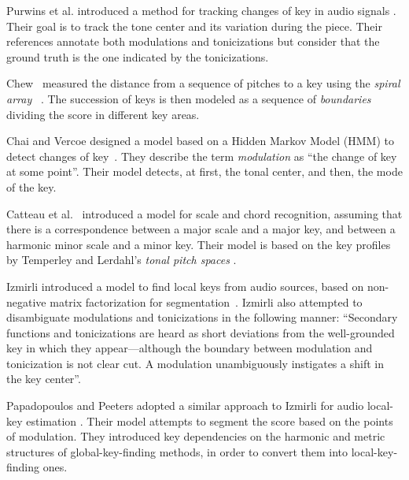 Purwins et al. introduced a method for tracking changes of key in audio signals %
\cite{purwins_new_2000}. 
Their goal is to track the tone center and its variation during the piece. Their references annotate both modulations and tonicizations but consider that the ground truth is the one indicated by the tonicizations.

Chew~\cite{chew2002key} measured the distance from a sequence of pitches to a key using the \emph{spiral array} ~\cite{Chew2000TowardsAM}. 
The succession of keys is then modeled as a sequence of \emph{boundaries} dividing the score in different key areas.

Chai and Vercoe designed a model based on a Hidden Markov Model (HMM) to detect changes of key~\cite{chai_detection_2005}. 
They describe the term \emph{modulation} as ``the change of key at some point''. 
Their model detects, at first, the tonal center, and then, the mode of the key.

Catteau et al.~\cite{Catteau07tonalkey} introduced a model for scale and chord recognition, assuming that there is a correspondence between a major scale and a major key, and between a harmonic minor scale and a minor key. Their model is based on the key profiles by Temperley \cite{Temperley99:tonality} and Lerdahl's \emph{tonal pitch spaces} \cite{lerdahl88tps}.

Izmirli introduced a model to find local keys from audio sources, based on non-negative matrix factorization for segmentation~\cite{izmirli_localized_2007}. 
Izmirli also attempted to disambiguate modulations and tonicizations in the following manner: ``Secondary functions and tonicizations are heard as short deviations from the well-grounded key in which they appear---although the boundary between modulation and tonicization is not clear cut. A modulation unambiguously instigates a shift in the key center''. 

Papadopoulos and Peeters adopted a similar approach to Izmirli for audio local-key estimation \cite{papadopoulos_local_2009}.
Their model attempts to segment the score based on the points of modulation. 
They introduced key dependencies on the harmonic and metric structures of global-key-finding methods, in order to convert them into local-key-finding ones. 

